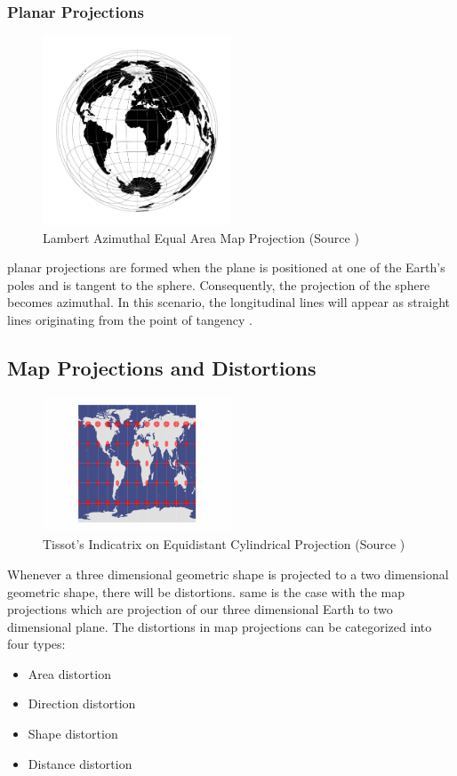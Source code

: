 \subsubsection{Planar Projections}

\begin{figure}[h]
    \centering
    \includegraphics[width=0.5\textwidth]{figures/chapter-3/laea.png}
    \caption{Lambert Azimuthal Equal Area Map Projection (Source \cite{PROJ_SITE})}
    \label{fig:vitkovsky-image}
\end{figure}

planar projections are formed when the plane is positioned at one of the Earth's poles and is tangent to the sphere. Consequently, the projection of the sphere becomes azimuthal. In this scenario, the longitudinal lines will appear as straight lines originating from the point of tangency \cite{Snyder1982}.


\subsection{Map Projections and Distortions}
\begin{figure}[H]
    \centering
    \includegraphics[width=0.5\textwidth]{figures/chapter-3/Tissot-Equidistant-Cylindrical-1-678x486.png}
    \caption{Tissot's Indicatrix on Equidistant Cylindrical Projection (Source \cite{GISGEO_Tissot})}
    \label{fig:tissot-image}
\end{figure}
Whenever a three dimensional geometric shape is projected to a two dimensional geometric shape, there will be distortions. same is the case with the map projections which are projection of our three dimensional Earth to two dimensional plane.
The distortions in map projections can be categorized into four types:
\begin{itemize}
    \item Area distortion
    \item Direction distortion
    \item Shape distortion
    \item Distance distortion
\end{itemize}

